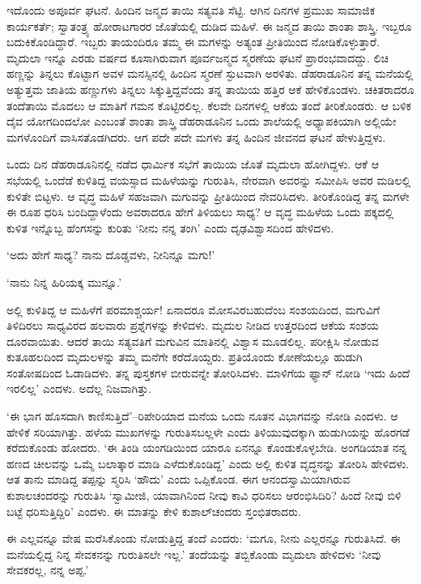 ಇದೊಂದು ಅಪೂರ್ವ ಘಟನೆ. ಹಿಂದಿನ ಜನ್ಮದ ತಾಯಿ ಸತ್ಯವತಿ ಸೆಟ್ಟಿ. ಆಗಿನ ದಿನಗಳ ಪ್ರಮುಖ ಸಾಮಾಜಿಕ ಕಾರ್ಯಕರ್ತೆ; ಸ್ವಾತಂತ್ರ್ಯ ಹೋರಾಟಗಾರರ ಜೊತೆಯಲ್ಲಿ ದುಡಿದ ಮಹಿಳೆ. ಈ ಜನ್ಮದ ತಾಯಿ ಶಾಂತಾ ಶಾಸ್ತ್ರಿ. ಇಬ್ಬರೂ ಬದುಕಿಕೊಂಡಿದ್ದಾರೆ. ಇಬ್ಬರು ತಾಯಂದಿರೂ ತಮ್ಮ ಈ ಮಗಳನ್ನು ಅತ್ಯಂತ ಪ್ರೀತಿಯಿಂದ ನೋಡಿಕೊಳ್ಳುತ್ತಾರೆ. ಮೃದುಲಾ ಇನ್ನೂ ಎರಡು ವರ್ಷದ ಕೂಸಾಗಿರುವಾಗ ಪೂರ್ವಜನ್ಮದ ಸ್ಮರಣೆಯ ಘಟನೆ ಪ್ರಾರಂಭವಾದದ್ದು. ಲಿಚಿ ಹಣ್ಣನ್ನು ತಿನ್ನಲು ಕೊಟ್ಟಾಗ ಅವಳ ಮನಸ್ಸಿನಲ್ಲಿ ಹಿಂದಿನ ಸ್ಮರಣೆ ಸ್ಫುಟವಾಗಿ ಅರಳಿತು. ಡೆಹರಾಡೂನಿನ ತನ್ನ ಮನೆಯಲ್ಲಿ ಅತ್ಯುತ್ತಮ ಜಾತಿಯ ಹಣ್ಣುಗಳು ತಿನ್ನಲು ಸಿಕ್ಕುತ್ತಿದ್ದವೆಂದು ತನ್ನ ತಾಯಿಯ ಹತ್ತಿರ ಆಕೆ ಹೇಳಿಕೊಂಡಳು. ಚಕಿತರಾದರೂ ತಂದೆತಾಯಿ ಮೊದಲು ಆ ಮಾತಿಗೆ ಗಮನ ಕೊಟ್ಟಿರಲಿಲ್ಲ. ಕೆಲವೇ ದಿನಗಳಲ್ಲಿ ಆಕೆಯ ತಂದೆ ತೀರಿಕೊಂಡರು. ಆ ಬಳಿಕ ದೈವ ಯೋಗದಿಂದಲೋ ಎಂಬಂತೆ ಶಾಂತಾ ಶಾಸ್ತ್ರಿ ಡೆಹರಾಡೂನಿನ ಒಂದು ಶಾಲೆಯಲ್ಲಿ ಅಧ್ಯಾಪಕಿಯಾಗಿ ಅಲ್ಲಿಯೇ ಮಗಳೊಂದಿಗೆ ವಾಸಿಸತೊಡಗಿದರು. ಆಗ ಪದೇ ಪದೇ ಮಗಳು ತನ್ನ ಹಿಂದಿನ ಜೀವನದ ಘಟನೆ ಹೇಳುತ್ತಿದ್ದಳು.

ಒಂದು ದಿನ ಡೆಹರಾಡೂನಿನಲ್ಲಿ ನಡೆದ ಧಾರ್ಮಿಕ ಸಭೆಗೆ ತಾಯಿಯ ಜೊತೆ ಮೃದುಲಾ ಹೋಗಿದ್ದಳು. ಆಕೆ ಆ ಸಭೆಯಲ್ಲಿ ಒಂದೆಡೆ ಕುಳಿತಿದ್ದ ವಯಸ್ಸಾದ ಮಹಿಳೆಯನ್ನು ಗುರುತಿಸಿ, ನೇರವಾಗಿ ಅವರನ್ನು ಸಮೀಪಿಸಿ ಅವರ ಮಡಿಲಲ್ಲಿ ಕುಳಿತೇ ಬಿಟ್ಟಳು. ಆ ವೃದ್ಧ ಮಹಿಳೆ ಸಹಜವಾಗಿ ಮಗುವನ್ನು ಪ್ರೀತಿಯಿಂದ ನೇವರಿಸಿದಳು. ತೀರಿಕೊಂಡಿದ್ದ ತನ್ನ ಮಗಳೇ ಈ ರೂಪ ಧರಿಸಿ ಬಂದಿದ್ದಾಳೆಂದು ಅವರಾದರೂ ಹೇಗೆ ತಿಳಿಯಲು ಸಾಧ್ಯ? ಆ ವೃದ್ಧ ಮಹಿಳೆಯ ಒಂದು ಪಕ್ಕದಲ್ಲಿ ಕುಳಿತ ಇನ್ನೊಬ್ಬ ಹೆಂಗಸನ್ನು ಕುರಿತು ‘ನೀನು ನನ್ನ ತಂಗಿ’ ಎಂದು ದೃಢವಿಶ್ವಾಸದಿಂದ ಹೇಳಿದಳು.

‘ಅದು ಹೇಗೆ ಸಾಧ್ಯ? ನಾನು ದೊಡ್ಡವಳು, ನೀನಿನ್ನೂ ಮಗು!’

‘ನಾನು ನಿನ್ನ ಹಿರಿಯಕ್ಕ ಮುನ್ನೂ.’

ಅಲ್ಲಿ ಕುಳಿತಿದ್ದ ಆ ಮಹಿಳೆಗೆ ಪರಮಾಶ್ಚರ್ಯ! ಏನಾದರೂ ಮೋಸವಿರಬಹುದೆಂಬ ಸಂಶಯದಿಂದ, ಮಗುವಿಗೆ ತಿಳಿದಿರಲು ಸಾಧ್ಯವಿರದ ಹಲವಾರು ಪ್ರಶ್ನೆಗಳನ್ನು ಕೇಳಿದಳು. ಮೃದುಲ ನೀಡಿದ ಉತ್ತರದಿಂದ ಆಕೆಯ ಸಂಶಯ ದೂರವಾಯಿತು. ಆದರೆ ತಾಯಿ ಸತ್ಯವತಿಗೆ ಮಗುವಿನ ಮಾತಿನಲ್ಲಿ ವಿಶ್ವಾಸ ಮೂಡಲಿಲ್ಲ. ಪರೀಕ್ಷಿಸಿ ನೋಡುವ ಕುತೂಹಲದಿಂದ ಮೃದುಲಳನ್ನು ತಮ್ಮ ಮನೆಗೇ ಕರೆದೊಯ್ದರು. ಪ್ರತಿಯೊಂದು ಕೋಣೆಯಲ್ಲೂ ಹುಡುಗಿ ಸಂತೋಷದಿಂದ ಓಡಾಡಿದಳು. ತನ್ನ ಪುಸ್ತಕಗಳ ಬೀರುವನ್ನೇ ತೋರಿಸಿದಳು. ಮಾಳಿಗೆಯ ಫ್ಯಾನ್ ನೋಡಿ ‘ಇದು ಹಿಂದೆ ಇರಲಿಲ್ಲ’ ಎಂದಳು. ಅದೆಲ್ಲ ನಿಜವಾಗಿತ್ತು.

‘ಈ ಭಾಗ ಹೊಸದಾಗಿ ಕಾಣಿಸುತ್ತಿದೆ’–ರಿಪೇರಿಯಾದ ಮನೆಯ ಒಂದು ನೂತನ ವಿಭಾಗವನ್ನು ನೋಡಿ ಎಂದಳು. ಆ ಹೇಳಿಕೆ ಸರಿಯಾಗಿತ್ತು. ಹಳೆಯ ಮುಖಗಳನ್ನು ಗುರುತಿಸಬಲ್ಲಳೇ ಎಂದು ತಿಳಿಯುವುದಕ್ಕಾಗಿ ಹುಡುಗಿಯನ್ನು ಹೊರಗಡೆ ಕರೆದುಕೊಂಡು ಹೋದರು. ‘ಈ ತಿಂಡಿ ಯಂಗಡಿಯಿಂದ ಯಾರೂ ಏನನ್ನೂ ಕೊಂಡುಕೊಳ್ಳಬೇಡಿ. ಅಂಗಡಿಯಾತ ನನ್ನ ಹಣದ ಚೀಲವನ್ನು ಒಮ್ಮೆ ಬಲಾತ್ಕಾರ ಮಾಡಿ ಎಳೆದುಕೊಂಡಿದ್ದ’ ಎಂದು ಅಲ್ಲಿ ಕುಳಿತ ವೃದ್ಧನನ್ನು ತೋರಿಸಿ ಹೇಳಿದಳು. ಆತ ತಾನು ಮಾಡಿದ್ದ ತಪ್ಪನ್ನು ಸ್ಮರಿಸಿ ‘ಹೌದು’ ಎಂದು ಒಪ್ಪಿಕೊಂಡ. ಈಗ ಆನಂದಸ್ವಾಮಿಯಾಗಿರುವ ಕುಶಾಲಚಂದರನ್ನು ಗುರುತಿಸಿ ‘ಸ್ವಾಮೀಜಿ, ಯಾವಾಗಿನಿಂದ ನೀವು ಕಾವಿ ಧರಿಸಲು ಆರಂಭಿಸಿದಿರಿ? ಹಿಂದೆ ನೀವು ಬಿಳಿ ಬಟ್ಟೆ ಧರಿಸುತ್ತಿದ್ದಿರಿ’ ಎಂದಳು. ಈ ಮಾತನ್ನು ಕೇಳಿ ಕುಶಾಲ್​ಚಂದರು ಸ್ತಂಭಿತರಾದರು.

ಈ ಎಲ್ಲವನ್ನೂ ವೇಷ ಮರೆಸಿಕೊಂಡು ನೋಡುತ್ತಿದ್ದ ತಂದೆ ಎಂದರು: ‘ಮಗೂ, ನೀನು ಎಲ್ಲರನ್ನೂ ಗುರುತಿಸಿದೆ. ಈ ಮನೆಯಲ್ಲಿದ್ದ ನಿನ್ನ ಸೇವಕನನ್ನು ಗುರುತಿಸಲೇ ಇಲ್ಲ.’ ತಂದೆಯನ್ನು ತಬ್ಬಿಕೊಂಡು ಮೃದುಲಾ ಹೇಳಿದಳು ‘ನೀವು ಸೇವಕರಲ್ಲ, ನನ್ನ ಅಪ್ಪ.’

